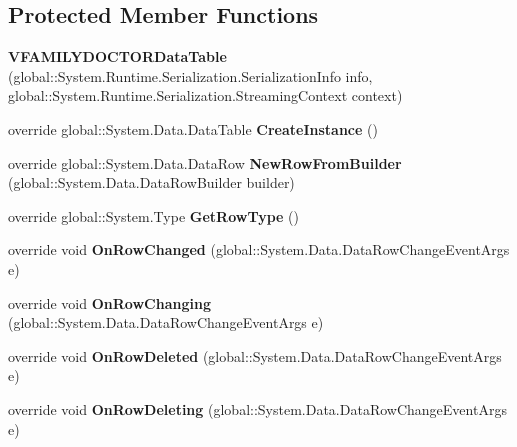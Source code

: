 \subsection*{Protected Member Functions}
\begin{CompactItemize}
\item 
\textbf{VFAMILYDOCTORDataTable} (global::System.Runtime.Serialization.SerializationInfo info, global::System.Runtime.Serialization.StreamingContext context)\label{class_automatic_medical_system_1_1_data_set2_1_1_v_f_a_m_i_l_y_d_o_c_t_o_r_data_table_3cce8d0ccf519daa9f18e170b76c9f81}

\item 
override global::System.Data.DataTable \textbf{CreateInstance} ()\label{class_automatic_medical_system_1_1_data_set2_1_1_v_f_a_m_i_l_y_d_o_c_t_o_r_data_table_22b44ac2147677b36cb358eb5156b786}

\item 
override global::System.Data.DataRow \textbf{NewRowFromBuilder} (global::System.Data.DataRowBuilder builder)\label{class_automatic_medical_system_1_1_data_set2_1_1_v_f_a_m_i_l_y_d_o_c_t_o_r_data_table_929330fb0f410b966ad8426eddcfc2c4}

\item 
override global::System.Type \textbf{GetRowType} ()\label{class_automatic_medical_system_1_1_data_set2_1_1_v_f_a_m_i_l_y_d_o_c_t_o_r_data_table_b55d538506ea25713fb0b75b683de2da}

\item 
override void \textbf{OnRowChanged} (global::System.Data.DataRowChangeEventArgs e)\label{class_automatic_medical_system_1_1_data_set2_1_1_v_f_a_m_i_l_y_d_o_c_t_o_r_data_table_f6b046105161097de19854a008f455d9}

\item 
override void \textbf{OnRowChanging} (global::System.Data.DataRowChangeEventArgs e)\label{class_automatic_medical_system_1_1_data_set2_1_1_v_f_a_m_i_l_y_d_o_c_t_o_r_data_table_8859f7cc228e38920001520f6b48fb21}

\item 
override void \textbf{OnRowDeleted} (global::System.Data.DataRowChangeEventArgs e)\label{class_automatic_medical_system_1_1_data_set2_1_1_v_f_a_m_i_l_y_d_o_c_t_o_r_data_table_545348c4ce026afd8c74af119ab42d67}

\item 
override void \textbf{OnRowDeleting} (global::System.Data.DataRowChangeEventArgs e)\label{class_automatic_medical_system_1_1_data_set2_1_1_v_f_a_m_i_l_y_d_o_c_t_o_r_data_table_9dc46e8843cc0f7934a6a729a1e0474f}

\end{CompactItemize}
